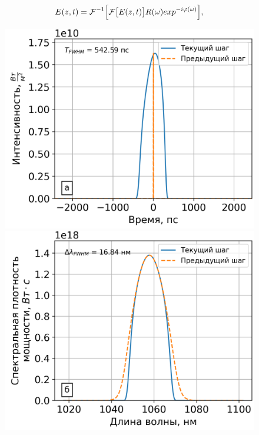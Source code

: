 \documentclass[12pt]{article}
\begin{document}
\begin{equation}
    E(z, t) = \mathcal{F}^{-1} \Bigl[ \mathcal{F} \bigl[ E(z, t) \bigr] R(\omega) exp^{-i\varphi(\omega)} \Bigr],
\end{equation}

\begin{figure}[h!]
  \centering
  \begin{minipage}[b]{0.5\textwidth}
    \includegraphics[width=\linewidth]{Images/Gauss Pulse/Импульс и спектр/!4. BFG_pusle}
  \end{minipage}%
  \begin{minipage}[b]{0.5\textwidth}
    \includegraphics[width=\linewidth]{Images/Gauss Pulse/Импульс и спектр/!4. BFG_spectrum}
  \end{minipage}


\end{figure}
\end{document}
